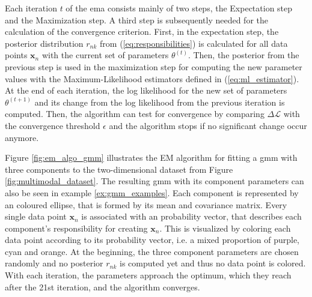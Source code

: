 \documentclass[../../../main.tex]{subfiles}
\begin{document}
Each iteration $t$ of the \acrshort{ema} consists mainly of two steps, the Expectation step and the Maximization step. A third step is subsequently needed for the calculation of the convergence criterion. First, in the expectation step, the posterior distribution $r_{nk}$ from (\ref{eq:responsibilities}) is calculated for all data points $\bm{x}_n$ with the current set of parameters $\theta^{(t)}$. Then, the posterior from the previous step is used in the maximization step for computing the new parameter values with the Maximum-Likelihood estimators defined in (\ref{eq:ml_estimator}). At the end of each iteration, the log likelihood for the new set of parameters $\theta^{(t+1)}$ and its change from the log likelihood from the previous iteration is computed. Then, the algorithm can test for convergence by comparing $\Delta \mathcal{L}$ with the convergence threshold $\epsilon$ and the algorithm stops if no significant change occur anymore.


Figure \ref{fig:em_algo_gmm} illustrates the EM algorithm for fitting a \acrshort{gmm} with three components to the two-dimensional dataset from Figure \ref{fig:multimodal_dataset}. The resulting \acrshort{gmm} with its component parameters can also be seen in example \ref{ex:gmm_examples}. Each component is represented by an coloured ellipse, that is formed by its mean and covariance matrix. Every single data point $\bm{x}_n$ is associated with an probability vector, that describes each component's responsibility for creating $\bm{x}_n$. This is visualized by coloring each data point according to its probability vector, i.e. a mixed proportion of purple, cyan and orange. At the beginning, the three component parameters are chosen randomly and no posterior $r_{nk}$ is computed yet and thus no data point is colored. With each iteration, the parameters approach the optimum, which they reach after the 21st iteration, and the algorithm converges.
\end{document}
